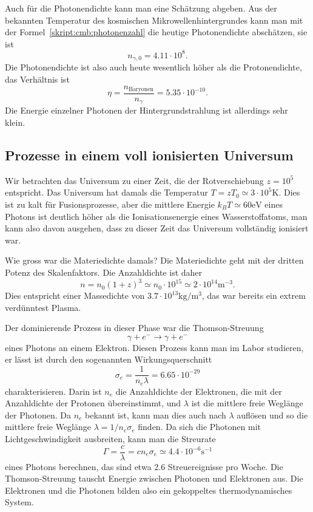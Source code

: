 Auch für die Photonendichte kann man eine Schätzung abgeben.
Aus der bekannten Temperatur des kosmischen Mikrowellenhintergrundes
kann man mit der Formel~\eqref{skript:cmb:photonenzahl} die heutige
Photonendichte abschätzen, sie ist
\[
n_{\gamma,0}=4.11\cdot 10^8.
\]
Die Photonendichte ist also auch heute wesentlich höher als die 
Protonendichte, das Verhältnis ist
\[
\eta = \frac{n_{\text{Baryonen}}}{n_\gamma} = 5.35\cdot 10^{-10}.
\]
Die Energie einzelner Photonen der Hintergrundstrahlung ist
allerdings sehr klein.

\subsection{Prozesse in einem voll ionisierten Universum}
Wir betrachten das Universum zu einer Zeit, die der Rotverschiebung
$z=10^5$ entspricht.
Das Universum hat damals die Temperatur $T=zT_0 \simeq 3\cdot 10^5\text{K}$.
Dies ist zu kalt für Fusionsprozesse, aber die mittlere Energie 
$k_BT\simeq 60\text{eV}$ eines Photons ist deutlich höher als die
Ionisationsenergie eines Wasserstoffatoms, man kann also davon ausgehen,
dass zu dieser Zeit das Universum vollständig ionisiert war.

Wie gross war die Materiedichte damals? 
Die Materiedichte geht mit der dritten Potenz des Skalenfaktors.
Die Anzahldichte ist daher
\[
n = n_0(1+z)^3 
\simeq
n_0\cdot 10^{15}
\simeq
2\cdot 10^{14}\text{m}^{-3}.
\]
Dies entspricht einer Massedichte von $3.7\cdot 10^{13}\text{kg}/\text{m}^3$,
das war bereits ein extrem verdünntest Plasma.

Der dominierende Prozess in dieser Phase war die Thomson-Streuung
\[
\gamma + e^- \to \gamma + e^-
\]
%
eines Photons an einem Elektron.
Diesen Prozess kann man im Labor studieren, er lässt ist durch den
sogenannten Wirkungsquerschnitt
\[
\sigma_e
=
\frac{1}{n_e\lambda}
=
6.65\cdot 10^{-29}
\]
charakterisieren.
Darin ist $n_e$ die Anzahldichte der Elektronen, die mit der Anzahldichte
der Protonen übereinstimmt, und $\lambda$ ist die mittlere freie
Weglänge der Photonen.
Da $n_e$ bekannt ist, kann man dies auch nach $\lambda$ auflösen und
so die mittlere freie Weglänge $\lambda=1/n_e\sigma_e$ finden.
Da sich die Photonen mit Lichtgeschwindigkeit ausbreiten, kann man
die Streurate
\[
\Gamma
=
\frac{c}{\lambda}
=
cn_e\sigma_e\simeq 4.4\cdot 10^{-6}\text{s}^{-1}
\]
eines Photons berechnen, das sind etwa 2.6 Streuereignisse pro Woche.
Die Thomson-Streuung tauscht Energie zwischen Photonen und Elektronen aus.
Die Elektronen und die Photonen bilden also ein gekoppeltes thermodynamisches
System.

